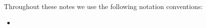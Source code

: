 \documentclass[../main.tex]{subfile}
\begin{document}
 Throughout these notes we use the following notation conventions:
 \begin{itemize}
  \item  
 \end{itemize}
\end{document}
